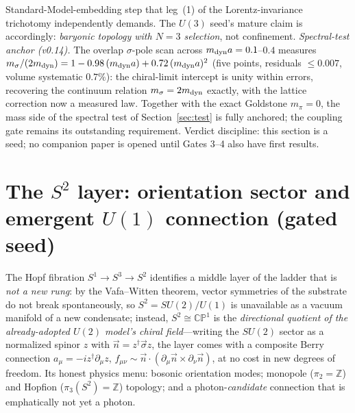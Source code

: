 \documentclass[11pt,a4paper]{article}
\begin{document}
Standard-Model-embedding step that leg~(1) of the
Lorentz-invariance trichotomy independently demands.
The $U(3)$ seed's mature claim is accordingly: \emph{baryonic
topology with $N = 3$ selection}, not confinement.
\emph{Spectral-test anchor (v0.14).}  The overlap $\sigma$-pole
scan across $m_{\rm dyn} a = 0.1$--$0.4$ measures
$m_\sigma/(2m_{\rm dyn}) = 1 - 0.98\,(m_{\rm dyn}a)
+ 0.72\,(m_{\rm dyn}a)^2$ (five points, residuals
$\leq 0.007$, volume systematic $0.7\%$): the chiral-limit
intercept is unity within errors, recovering the continuum
relation $m_\sigma = 2m_{\rm dyn}$ exactly, with the lattice
correction now a measured law.  Together with the exact Goldstone
$m_\pi = 0$, the mass side of the spectral test of
Section~\ref{sec:test} is fully anchored; the coupling gate
remains its outstanding requirement.
Verdict discipline: this section is a seed; no companion paper is
opened until Gates 3--4 also have first results.


\section{The $S^2$ layer: orientation sector and emergent
$U(1)$ connection (gated seed)}
\label{sec:s2seed}

The Hopf fibration $S^1 \to S^3 \to S^2$ identifies a middle layer
of the ladder that is \emph{not a new rung}: by the Vafa--Witten
theorem, vector symmetries of the substrate do not break
spontaneously, so $S^2 = SU(2)/U(1)$ is unavailable as a vacuum
manifold of a new condensate; instead, $S^2 \cong \mathbb{CP}^1$
is the \emph{directional quotient of the already-adopted $U(2)$
model's chiral field}---writing the $SU(2)$ sector as a normalized
spinor $z$ with $\vec n = z^\dagger\vec\sigma z$, the layer comes
with a composite Berry connection
$a_\mu = -i z^\dagger\partial_\mu z$,
$f_{\mu\nu} \sim \vec n\cdot(\partial_\mu\vec n\times
\partial_\nu\vec n)$, at no cost in new degrees of freedom.
Its honest physics menu: bosonic orientation modes; monopole
($\pi_2 = \mathbb{Z}$) and Hopfion ($\pi_3(S^2) = \mathbb{Z}$)
topology; and a photon-\emph{candidate} connection that is
emphatically not yet a photon.
\end{document}
